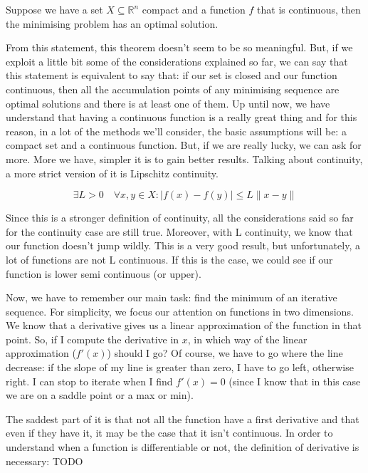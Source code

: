 \begin{theorem}
Suppose we have a set $X \subseteq \mathbb{R}^n$ compact and a function $f$ that is continuous, then the minimising problem has an optimal solution.
\end{theorem}
From this statement, this theorem doesn't seem to be so meaningful. But, if we exploit a little bit some of the considerations explained so far, we can say that this statement is equivalent to say that: if our set is closed and our function continuous, then all the accumulation points of any minimising sequence are optimal solutions and there is at least one of them.
Up until now, we have understand that having a continuous function is a really great thing and for this reason, in a lot of the methods we'll consider, the basic assumptions will be: a compact set and a continuous function.
But, if we are really lucky, we can ask for more. More we have, simpler it is to gain better results.
Talking about continuity, a more strict version of it is Lipschitz continuity.
\begin{theorem}
\[
    \exists L > 0 \quad \forall x,y \in X : |f(x) - f(y)| \leq L \lVert x - y \rVert 
\]
\end{theorem}
Since this is a stronger definition of continuity, all the considerations said so far for the continuity case are still true. Moreover, with L continuity, we know that our function doesn't jump wildly. This is a very good result, but unfortunately, a lot of functions are not L continuous. If this is the case, we could see if our function is lower semi continuous (or upper).
%
\par Now, we have to remember our main task: find the minimum of an iterative sequence. For simplicity, we focus our attention on functions in two dimensions. We know that a derivative gives us a linear approximation of the function in that point. So, if I compute the derivative in $x$, in which way of the linear approximation ($f'(x)$) should I go? Of course, we have to go where the line decrease: if the slope of my line is greater than zero, I have to go left, otherwise right. I can stop to iterate when I find $f'(x)=0$ (since I know that in this case we are on a saddle point or a max or min).
\par The saddest part of it is that not all the function have a first derivative and that even if they have it, it may be the case that it isn't continuous. In order to understand when a function is differentiable or not, the definition of derivative is necessary: TODO



